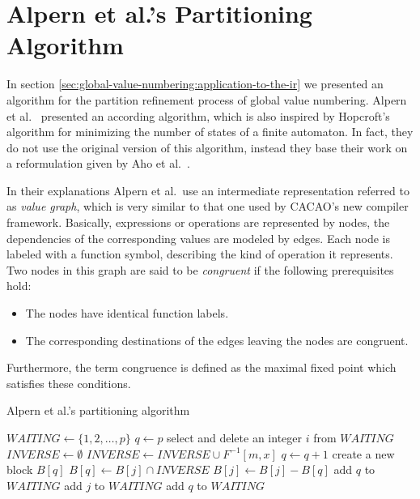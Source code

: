 \section{Alpern et al.'s Partitioning Algorithm}
\label{sec:alpern-partitioning}

In section \ref{sec:global-value-numbering:application-to-the-ir} we presented an algorithm for the partition refinement process of global value numbering. Alpern et al.\ \cite{alpern:1988:detecting-equality-of-variables} presented an according algorithm, which is also inspired by Hopcroft's algorithm for minimizing the number of states of a finite automaton. In fact, they do not use the original version of this algorithm, instead they base their work on a reformulation given by Aho et al.\ \cite{aho:1974:the-design-and-analysis-of-computer-algorithms}.

In their explanations Alpern et al.\ use an intermediate representation referred to as \emph{value graph}, which is very similar to that one used by CACAO's new compiler framework. Basically, expressions or operations are represented by nodes, the dependencies of the corresponding values are modeled by edges. Each node is labeled with a function symbol, describing the kind of operation it represents. Two nodes in this graph are said to be \emph{congruent} if the following prerequisites hold:
\begin{itemize}
\item The nodes have identical function labels.
\item The corresponding destinations of the edges leaving the nodes are congruent.
\end{itemize}
Furthermore, the term congruence is defined as the maximal fixed point which satisfies these conditions.

\begin{algorithm}[H]
\caption{Alpern et al.'s partitioning algorithm}
\label{alg:alpern-partitioning}
\begin{algorithmic}[1]
\State $\mathit{WAITING} \leftarrow \lbrace 1, 2, \ldots , p\rbrace$
\State $q \leftarrow p$
	\State select and delete an integer $i$ from $\mathit{WAITING}$
	\label{alg:alpern-partitioning:operand-index-loop}
		\State $\mathit{INVERSE} \leftarrow \emptyset$
			\State $\mathit{INVERSE} \leftarrow \mathit{INVERSE}\cup F^{-1}[m, x]$
		\EndFor
		\label{alg:alpern-partitioning:inverse-loop}
			\State $q \leftarrow q + 1$
			\State create a new block $B[q]$
			\State $B[q] \leftarrow B[j] \cap \mathit{INVERSE}$
			\State $B[j] \leftarrow B[j] - B[q]$
			\label{alg:alpern-partitioning:if-in-waiting}
				\State add $q$ to $\mathit{WAITING}$
			\Else
					\State add $j$ to $\mathit{WAITING}$
				\Else
					\State add $q$ to $\mathit{WAITING}$
				\EndIf
			\EndIf
		\EndFor
	\EndFor
\EndWhile
\end{algorithmic}
\end{algorithm}

